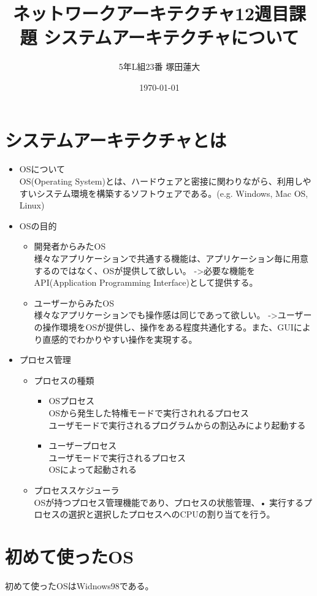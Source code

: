 \documentclass[a4j,uplatex]{jsarticle}
\title{\vspace{-5cm}ネットワークアーキテクチャ12週目課題 システムアーキテクチャについて}
\author{5年L組23番 塚田蓮大}
\date{\today}
\numberwithin{equation}{section}
\begin{document}
\maketitle

\section*{システムアーキテクチャとは}
\begin{itemize}
	\item OSについて \mbox{}\\
	      OS(Operating System)とは、ハードウェアと密接に関わりながら、利用しやすいシステム環境を構築するソフトウェアである。(e.g. Windows, Mac OS, Linux)
	\item OSの目的 \mbox{}\\
	      \begin{itemize}
		      \item 開発者からみたOS \mbox{}\\
		            様々なアプリケーションで共通する機能は、アプリケーション毎に用意するのではなく、OSが提供して欲しい。
		            ->必要な機能をAPI(Application Programming Interface)として提供する。
		      \item ユーザーからみたOS \mbox{}\\
		            様々なアプリケーションでも操作感は同じであって欲しい。
		            ->ユーザーの操作環境をOSが提供し、操作をある程度共通化する。また、GUIにより直感的でわかりやすい操作を実現する。
	      \end{itemize}
	\item プロセス管理 \mbox{}\\
	      \begin{itemize}
		      \item プロセスの種類 \mbox{}\\
		            \begin{itemize}
			            \item OSプロセス \mbox{}\\
			                  OSから発生した特権モードで実行されれるプロセス\\
			                  ユーザモードで実⾏されるプログラムからの割込みにより起動する
			            \item ユーザープロセス \mbox{}\\
			                  ユーザモードで実⾏されるプロセス\\
			                  OSによって起動される
		            \end{itemize}
		      \item プロセススケジューラ \mbox{}\\
		            OSが持つプロセス管理機能であり、プロセスの状態管理、• 実⾏するプロセスの選択と選択したプロセスへのCPUの割り当てを行う。
	      \end{itemize}
\end{itemize}
\section*{初めて使ったOS}
初めて使ったOSはWidnows98である。
\end{document}
